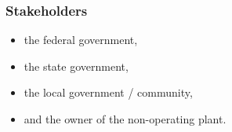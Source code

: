 \begin{frame}
	\frametitle{Stakeholders}
	\begin{itemize}
		\item the federal government,
		\item the state government,
		\item the local government / community,
		\item and the owner of the non-operating plant.
	\end{itemize}
\end{frame}

